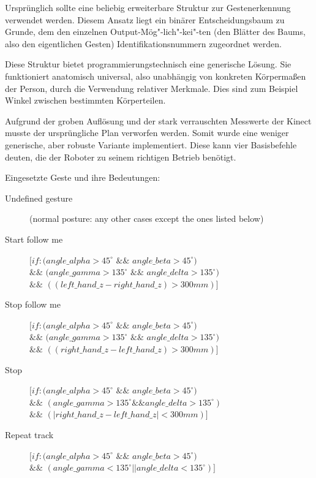Ursprünglich sollte eine beliebig erweiterbare Struktur zur Gestenerkennung verwendet werden.
 Diesem Ansatz liegt ein binärer Entscheidungsbaum zu Grunde, dem den einzelnen
 Output-Mög"-lich"-kei"-ten (den Blätter des Baums, also den eigentlichen
 Gesten) Identifikationsnummern zugeordnet werden.

Diese Struktur bietet programmierungstechnisch eine generische Lösung. Sie funktioniert anatomisch universal,
 also unabhängig von konkreten Körpermaßen der Person, durch die Verwendung relativer Merkmale.
 Dies sind zum Beispiel Winkel zwischen bestimmten Körperteilen.
 
Aufgrund der groben Auflösung und der stark verrauschten Messwerte der Kinect musste der ursprüngliche Plan verworfen werden.
 Somit wurde eine weniger generische, aber robuste Variante implementiert. Diese kann vier Basisbefehle deuten, die der Roboter zu seinem richtigen Betrieb benötigt.
\vspace{0.3cm}

\noindent Eingesetzte Geste und ihre Bedeutungen:
\begin{description}
  \item[Undefined gesture] (normal posture: any other cases except the ones
  listed below)
  \item[Start follow me] 
  $[if: (angle\_alpha > 45^\circ$ $\&\&$ $angle\_beta >
  45^\circ)$\\
  $\&\&$ $(angle\_gamma > 135^\circ$ $\&\&$ $angle\_delta >
  135^\circ)$\\
  $\&\&$ $((left\_hand\_z - right\_hand\_z) > 300 mm)]$
  \item[Stop follow me] $[if: (angle\_alpha > 45^\circ$ $\&\&$ $angle\_beta >
  45^\circ)$\\
  $\&\&$ $(angle\_gamma > 135^\circ$ $\&\&$ $angle\_delta > 135^\circ)$\\
  $\&\&$ $((right\_hand\_z - left\_hand\_z) > 300 mm)]$
  \item[Stop] $[if: (angle\_alpha > 45^\circ$ $\&\&$ $angle\_beta > 45^\circ)$\\
  $\&\&$ $(angle\_gamma > 135^\circ \&\& angle\_delta > 135^\circ)$\\
  $\&\&$ $(|right\_hand\_z - left\_hand\_z| < 300 mm)]$
  \item[Repeat track] $[if: (angle\_alpha > 45^\circ$ $\&\&$ $angle\_beta >
  45^\circ)$\\
  $\&\&$ $(angle\_gamma < 135^\circ || angle\_delta < 135^\circ)]$
\end{description}


